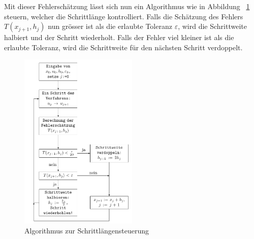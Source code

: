 Mit dieser Fehlerschätzung lässt sich nun ein Algorithmus wie in Abbildung ~\ref{buch:steps:flowchartfehlberg} steuern,
welcher die Schrittlänge kontrolliert. Falls die Schätzung des Fehlers $T(x_{j+1}, h_j)$ nun grösser ist als die erlaubte Toleranz $\varepsilon$,
wird die Schrittweite halbiert und der Schritt wiederholt.
Falls der Fehler viel kleiner ist als die erlaubte Toleranz, wird die Schrittweite für den nächsten Schritt verdoppelt.

\begin{figure}
  \centering
  \includegraphics[width=0.5\textwidth]{papers/steps/img/Fehlberg_Flowchart.pdf}
  \caption{Algorithmus zur Schrittlängensteuerung
    \label{buch:steps:flowchartfehlberg}}
\end{figure}

